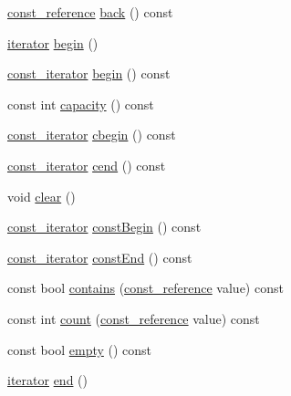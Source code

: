 \begin{DoxyCompactItemize}
\item 
\hyperlink{classprism_1_1_deque_affa26df70d5123f79a59386056e920c3}{const\+\_\+reference} \hyperlink{classprism_1_1_deque_a878213e7411751aceae1d7f3850815e4}{back} () const 
\item 
\hyperlink{classprism_1_1_deque_a263fd8daf307719cd101c97028fe68a1}{iterator} \hyperlink{classprism_1_1_deque_a525d396476dc97cc6064792d83e2837f}{begin} ()
\item 
\hyperlink{classprism_1_1_deque_a264ab74c18a153ed1d225cb7b29d8f17}{const\+\_\+iterator} \hyperlink{classprism_1_1_deque_a00798c9fa03181f3ec34d5394c0be0ec}{begin} () const 
\item 
const int \hyperlink{classprism_1_1_deque_ad7454c44d9bfae3df4d0aed803605380}{capacity} () const 
\item 
\hyperlink{classprism_1_1_deque_a264ab74c18a153ed1d225cb7b29d8f17}{const\+\_\+iterator} \hyperlink{classprism_1_1_deque_a675899011620fb6ba6bfbdc886ffdc5d}{cbegin} () const 
\item 
\hyperlink{classprism_1_1_deque_a264ab74c18a153ed1d225cb7b29d8f17}{const\+\_\+iterator} \hyperlink{classprism_1_1_deque_a5e0f8be0a4c64389a41a1c2f6f0467c2}{cend} () const 
\item 
void \hyperlink{classprism_1_1_deque_a7bd2f8032b34a0db5dc6e9eeacf62137}{clear} ()
\item 
\hyperlink{classprism_1_1_deque_a264ab74c18a153ed1d225cb7b29d8f17}{const\+\_\+iterator} \hyperlink{classprism_1_1_deque_a7cd21cc80cca9ca1486ff4143dc5c4e1}{const\+Begin} () const 
\item 
\hyperlink{classprism_1_1_deque_a264ab74c18a153ed1d225cb7b29d8f17}{const\+\_\+iterator} \hyperlink{classprism_1_1_deque_a543ef97bd3a666d069bc1e495cd85dda}{const\+End} () const 
\item 
const bool \hyperlink{classprism_1_1_deque_ad748d77c8008715e50a48a9243481706}{contains} (\hyperlink{classprism_1_1_deque_affa26df70d5123f79a59386056e920c3}{const\+\_\+reference} value) const 
\item 
const int \hyperlink{classprism_1_1_deque_afbd3bd892ee68247cb75a7bfb8b168e2}{count} (\hyperlink{classprism_1_1_deque_affa26df70d5123f79a59386056e920c3}{const\+\_\+reference} value) const 
\item 
const bool \hyperlink{classprism_1_1_deque_a9464fc0d35991fa28963aa88851b2f5d}{empty} () const 
\item 
\hyperlink{classprism_1_1_deque_a263fd8daf307719cd101c97028fe68a1}{iterator} \hyperlink{classprism_1_1_deque_ae5d9c6b0cca8df115d1ebd26cf4da965}{end} ()

\end{DoxyCompactItemize}
